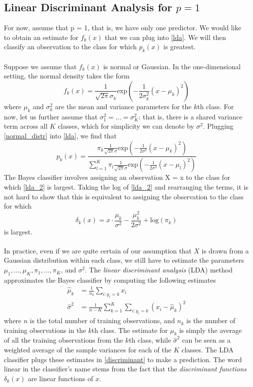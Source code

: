 \subsection{Linear Discriminant Analysis for $p = 1$}
For now, assume that p = 1, that is, we have only one predictor. We would like to obtain an estimate for $f_k(x)$ that we can plug into \ref{lda}. We will then classify an observation to the class for which $p_k(x)$ is greatest.\\\\
Suppose we assume that $f_k(x)$ is normal or Gaussian. In the one-dimensional setting, the normal density takes the form
\begin{equation}
    f_k(x) = \frac{1}{\sqrt{2\pi}\sigma_k}\text{exp}\left(-\frac{1}{2\sigma_k^2}(x - \mu_k)^2  \right)
    \label{normal_distr}
\end{equation}
where $\mu_k$ and $\sigma_k^2$ are the mean and variance parameters for the $k$th class. For now, let us further assume that $\sigma_1^2 = ... = \sigma_K^2$: that is, there is a shared variance term across all $K$ classes, which for simplicity we can denote by $\sigma^2$. Plugging \ref{normal_distr} into \ref{lda}, we find that
\begin{equation}
    p_k(x) = \frac{\pi_k \frac{1}{\sqrt{2\pi}\sigma}\text{exp}(-\frac{1}{2\sigma^2}(x - \mu_k)^2)}{\sum_{l=1}^K \pi_l \frac{1}{\sqrt{2\pi}\sigma}\text{exp}(-\frac{1}{2\sigma^2}(x - \mu_l)^2)}
    \label{lda_2}
\end{equation}
The Bayes classifier involves assigning an observation X = x to the class for which \ref{lda_2} is largest. Taking the log of \ref{lda_2} and rearranging the terms, it is not hard to show that this is equivalent to assigning the observation to the class for which
\begin{equation}
    \delta_k(x) = x \cdot \frac{\mu_k}{\sigma^2} - \frac{\mu_k^2}{2\sigma^2} + \text{log}(\pi_k)
    \label{discriminant}
\end{equation}
is largest.
\\\\
In practice, even if we are quite certain of our assumption that $X$ is drawn from a Gaussian distribution within each class, we still have to estimate the parameters $\mu_1,...,\mu_K, \pi_1,...,\pi_K$, and $\sigma^2$. The \textit{linear discriminant analysis} (LDA) method approximates the Bayes classifier by computing the following estimates
\[\begin{split}
    \hat{\mu}_k & = \frac{1}{n_k}\sum_{i:y_i = k}x_i\\
    \hat{\sigma}^2 & = \frac{1}{n - K}\sum_{k=1}^K\sum_{i:y_i = k} (x_i - \hat{\mu}_k)^2
\end{split}\] 
where $n$ is the total number of training observations, and $n_k$ is the number of training observations in the $k$th class. The estimate for $\mu_k$ is simply the average of all the training observations from the $k$th class, while $\hat{\sigma}^2$ can be seen as a weighted average of the sample variances for each of the $K$ classes. The LDA classifier plugs these estimates in \ref{discriminant} to make a prediction. The word linear in the classifier’s name stems from the fact that the \textit{discriminant functions} $\delta_k(x)$  are linear functions of $x$.

